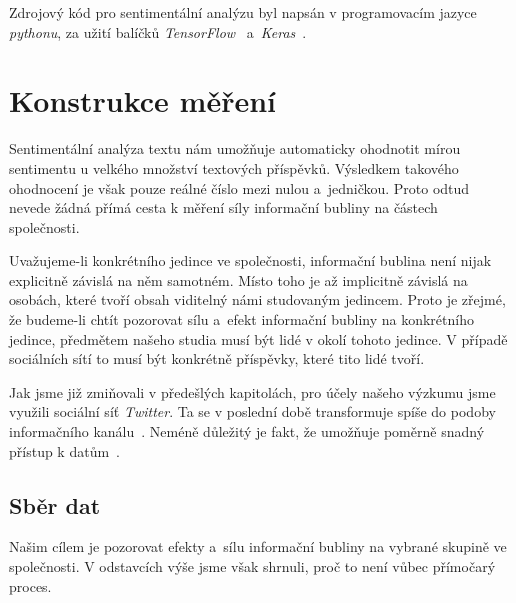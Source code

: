\documentclass[12pt, a4paper]{article}
\numberwithin{equation}{section} 	%
\begin{document}
Zdrojový kód pro sentimentální analýzu byl napsán v programovacím jazyce \textit{pythonu}, za užití balíčků \textit{TensorFlow}~\cite{TensorFlow} a~\textit{Keras}~\cite{keras}.

\newpage
\section{Konstrukce měření}
\noindent Sentimentální analýza textu nám umožňuje automaticky ohodnotit mírou sentimentu u velkého množství textových příspěvků. Výsledkem takového ohodnocení je však pouze reálné číslo mezi nulou a~jedničkou. Proto odtud nevede žádná přímá cesta k měření síly informační bubliny na částech společnosti.

Uvažujeme-li konkrétního jedince ve společnosti, informační bublina není nijak explicitně závislá na něm samotném. Místo toho je až implicitně závislá na osobách, které tvoří obsah viditelný námi studovaným jedincem. Proto je zřejmé, že budeme-li chtít pozorovat sílu a~efekt informační bubliny na konkrétního jedince, předmětem našeho studia musí být lidé v okolí tohoto jedince. V případě sociálních sítí to musí být konkrétně příspěvky, které tito lidé tvoří.

Jak jsme již zmiňovali v předešlých kapitolách, pro účely našeho výzkumu jsme využili sociální síť \textit{Twitter}. Ta se v poslední době transformuje spíše do podoby informačního kanálu~\cite{whyNotFb}. Neméně důležitý je fakt, že umožňuje poměrně snadný přístup k datům~\cite{tweepy, twitterAPI}.

\subsection{Sběr dat}
\noindent Našim cílem je pozorovat efekty a~sílu informační bubliny na vybrané skupině ve společnosti. V odstavcích výše jsme však shrnuli, proč to není vůbec přímočarý proces.
\end{document}
